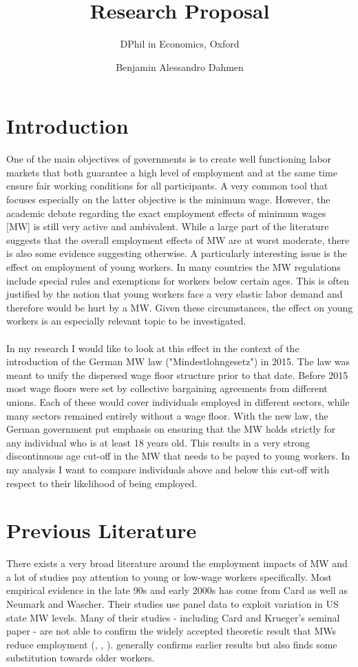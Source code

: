 \documentclass[11pt]{scrartcl}
\title{Research Proposal}
\subtitle{DPhil in Economics, Oxford}
\author{Benjamin Alessandro Dahmen}
\begin{document}
	\maketitle
	
\section{Introduction}
One of the main objectives of governments is to create well functioning labor markets that both guarantee a high level of employment and at the same time ensure fair working conditions for all participants. A very common tool that focuses especially on the latter objective is the minimum wage. However, the academic debate regarding the exact employment effects of minimum wages [MW] is still very active and ambivalent. While a large part of the literature suggests that the overall employment effects of MW are at worst moderate, there is also some evidence suggesting otherwise. A particularly interesting issue is the effect on employment of young workers. In many countries the MW regulations include special rules and exemptions for workers below certain ages. This is often justified by the notion that young workers face a very elastic labor demand and therefore would be hurt by a MW. Given these circumstances, the effect on young workers is an especially relevant topic to be investigated. \\ \\
In my research I would like to look at this effect in the context of the introduction of the German MW law ("Mindestlohngesetz") in 2015. The law was meant to unify the dispersed wage floor structure prior to that date. Before 2015 most wage floors were set by collective bargaining agreements from different unions. Each of these would cover individuals employed in different sectors, while many sectors remained entirely without a wage floor. With the new law, the German government put emphasis on ensuring that the MW holds strictly for any individual who is at least 18 years old. This results in a very strong discontinuous age cut-off in the MW that needs to be payed to young workers. In my analysis I want to compare individuals above and below this cut-off with respect to their likelihood of being employed.

\section{Previous Literature}
There exists a very broad literature around the employment impacts of MW and a lot of studies pay attention to young or low-wage workers specifically. Most empirical evidence in the late 90s and early 2000s has come from Card as well as Neumark and Wascher. Their studies use panel data to exploit variation in US state MW levels. Many of their studies - including Card and Krueger's seminal \citeyear{CardKrueger1994} paper - are not able to confirm the widely accepted theoretic result that MWs reduce employment (\cite{CardMWVariation1992}, \cite{CardMW1992}, \cite{NeumarkWascherMW1992}). \textcite{PereiraMWPortugal2003} generally confirms earlier results but also finds some substitution towards older workers. \\
\end{document}
